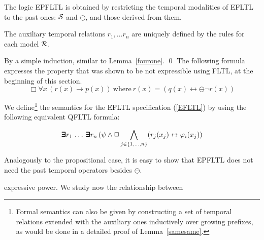 The logic EPFLTL is obtained by restricting the temporal modalities of EFLTL to the past ones:
${\cal S}$ and $\ominus$, and those derived from them.

\begin{lemma} \label{samesame}
The auxiliary temporal relations $r_1, \ldots r_n$ are
uniquely defined by the rules for each model ${\cal R}$.
\end{lemma}
 By a simple induction, similar to Lemma~\ref{fourone}. \qed
\vspace{1ex}
The following formula expresses the property that was shown to be 
not expressible using FLTL, at the beginning of this section.
\begin{equation}
\Box \forall x \, (r(x)\rightarrow p(x)) \mathrm{\ where\ }
r(x) = ( q(x) \leftrightarrow \ominus \neg  r(x)) 
\label{eq:wolper-first-order}
\end{equation}

\noindent
We define\footnote{ Formal semantics 
can also be given by constructing a set of temporal relations extended
with the auxiliary ones
inductively over growing prefixes, as would be done in a detailed proof of Lemma~\ref{samesame}.} the semantics for the EFLTL 
specification (\ref{EFLTL}) 
by using the following equivalent
QFLTL formula:

\begin{equation} \label{equiv}
\bm{\exists}\kern-0.6em\bm{\exists} r_1  \, \ldots \, \bm{\exists}\kern-0.6em\bm{\exists} r_n \,  ( \psi \wedge \Box \bigwedge_{j \in \{ 1, \ldots , n\}} (r_j ( x_j )  \leftrightarrow 
\varphi_i ( x_j) )
\end{equation}

\noindent 
Analogously to the propositional case, it is easy to show that EPFLTL does not
need the past temporal operators besides $\ominus$.




expressive power. We study now the relationship between

